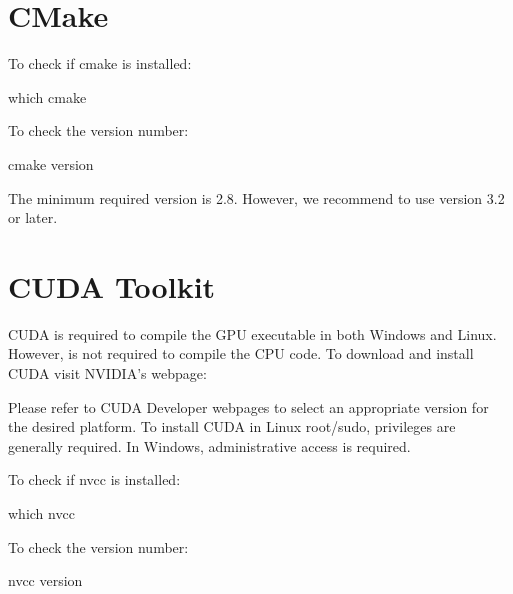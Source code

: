\documentclass[letterpaper,10pt,english]{sphinxmanual}
\begin{document}
\section{CMake}
\label{\detokenize{software_requirements:cmake}}
\sphinxAtStartPar
To check if cmake is installed:

\begin{sphinxVerbatim}[commandchars=\\\{\}]
\PYGZdl{} which cmake
\end{sphinxVerbatim}

\sphinxAtStartPar
To check the version number:

\begin{sphinxVerbatim}[commandchars=\\\{\}]
\PYGZdl{} cmake \PYGZhy{}\PYGZhy{}version
\end{sphinxVerbatim}

\sphinxAtStartPar
The minimum required version is 2.8. However, we recommend to use version 3.2 or later.


\section{CUDA Toolkit}
\label{\detokenize{software_requirements:cuda-toolkit}}
\sphinxAtStartPar
CUDA is required to compile the GPU executable in both Windows and Linux. However, is not required to compile the CPU code. To download and install CUDA visit NVIDIA’s webpage:

\sphinxAtStartPar
{}

\sphinxAtStartPar
{}

\sphinxAtStartPar
Please refer to CUDA Developer webpages to select an appropriate version for the desired platform. To install CUDA in Linux root/sudo, privileges are generally required. In Windows, administrative access is required.

\sphinxAtStartPar
To check if nvcc is installed:

\begin{sphinxVerbatim}[commandchars=\\\{\}]
\PYGZdl{} which nvcc
\end{sphinxVerbatim}

\sphinxAtStartPar
To check the version number:

\begin{sphinxVerbatim}[commandchars=\\\{\}]
\PYGZdl{} nvcc \PYGZhy{}\PYGZhy{}version
\end{sphinxVerbatim}
\end{document}

